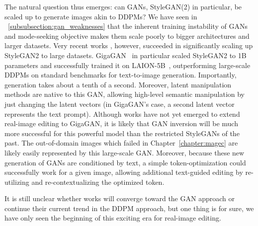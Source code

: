 The natural question thus emerges: can \ac{GAN}s, StyleGAN(2) in particular, be scaled up to generate images akin  to \ac{DDPM}s? We have seen in 
~\ref{subsubsection:gan_weaknesses} that the inherent training instability of \ac{GAN}s and mode-seeking objective makes them scale poorly to 
bigger architectures and larger datasets. Very recent works \citep{sauer2022styleganxl, kang2023scaling}, however, succeeded in significantly scaling up 
StyleGAN2 to large datasets. GigaGAN~\citep{kang2023scaling} in particular scaled StyleGAN2 to 1B parameters and successfully trained it on LAION-5B~\citep{schuhmann2022laion}, 
outperforming large-scale \ac{DDPM}s on standard benchmarks for text-to-image generation. Importantly, generation takes about a tenth of a second. 
Moreover, latent manipulation methods are native to this \ac{GAN}, 
allowing high-level semantic manipulation by just changing the latent vectors (in GigaGAN's case, a second latent vector represents the text prompt).
Although works have not yet emerged to extend real-image editing to GigaGAN, it is likely that \ac{GAN} inversion will be much more successful for this 
powerful model than the restricted StyleGANs of the past. The out-of-domain images which failed in Chapter~\ref{chapter:magec} are likely  easily represented 
by this large-scale \ac{GAN}. Moreover, because these new generation of \ac{GAN}s are conditioned by text, a simple token-optimization could successfully work 
for a given image, allowing additional text-guided editing by re-utilizing and re-contextualizing the optimized token. 

It is still unclear whether works 
will converge toward the \ac{GAN} approach or continue their current trend in the \ac{DDPM} approach, but one thing is for sure, we have only seen the 
beginning of this exciting era for real-image editing.
